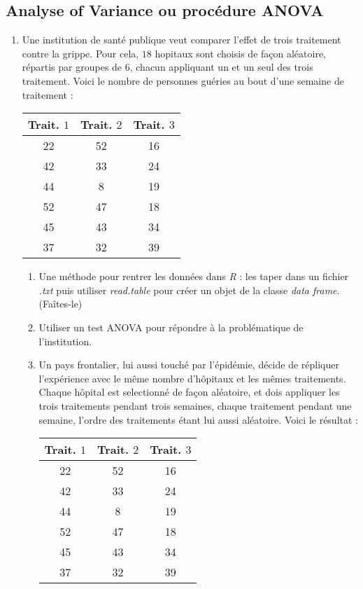 \subsection{Analyse of Variance ou procédure ANOVA}
\begin{enumerate}
\item Une institution de santé publique veut comparer l'effet de trois traitement contre la grippe. Pour cela, $18$ hopitaux sont choisis de façon aléatoire, répartis par groupes de $6$, chacun appliquant un et un seul des trois traitement. Voici le nombre de personnes guéries au bout d'une semaine de traitement : \\

\begin{center}
\begin{tabular}{|c|c|c|}
\hline
Trait. $1$ & Trait. $2$ & Trait. $3$ \\
\hline
22 & 52 & 16 \\
42 & 33 & 24 \\
44 & 8 & 19 \\
52 & 47 & 18 \\
45 & 43 & 34 \\
37 & 32 & 39 \\
\hline
\end{tabular}
\end{center}

\begin{enumerate}
\item Une méthode pour rentrer les données dans \textit{R} : les taper dans un fichier \textit{.txt} puis utiliser \textit{read.table}  pour créer un objet de la classe \textit{data frame}. (Faîtes-le)
\item Utiliser un test ANOVA pour répondre à la problématique de l'institution.
\item Un pays frontalier, lui aussi touché par l'épidémie, décide de répliquer l'expérience avec le même nombre d'hôpitaux et les mêmes traitements. Chaque hôpital est selectionné de façon aléatoire, et dois appliquer les trois traitements pendant trois semaines, chaque traitement pendant une semaine, l'ordre des traitements étant lui aussi aléatoire. Voici le résultat :

\begin{center}
\begin{tabular}{|c|c|c|}
\hline
Trait. $1$ & Trait. $2$ & Trait. $3$ \\
\hline
22 & 52 & 16 \\
42 & 33 & 24 \\
44 & 8 & 19 \\
52 & 47 & 18 \\
45 & 43 & 34 \\
37 & 32 & 39 \\
\hline
\end{tabular}
\end{center}
\end{enumerate}

\end{enumerate}



